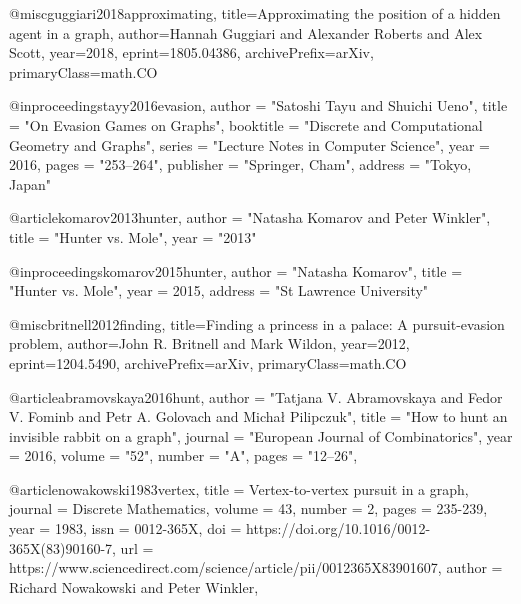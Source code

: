 @misc{guggiari2018approximating,
      title={Approximating the position of a hidden agent in a graph}, 
      author={Hannah Guggiari and Alexander Roberts and Alex Scott},
      year={2018},
      eprint={1805.04386},
      archivePrefix={arXiv},
      primaryClass={math.CO}
    }

@inproceedings{tayy2016evasion,
      author    = "Satoshi Tayu and Shuichi Ueno",
      title     = "On Evasion Games on Graphs",
      booktitle = "Discrete and Computational Geometry and Graphs",
      series    = "Lecture Notes in Computer Science",
      year      = 2016,
      pages     = "253--264",
      publisher = "Springer, Cham",
      address   = "Tokyo, Japan"
    }
    
@article{komarov2013hunter,
      author = "Natasha Komarov and Peter Winkler",
      title  = "Hunter vs. Mole",
      year   = "2013"
    }

@inproceedings{komarov2015hunter,
      author = "Natasha Komarov",
      title = "Hunter vs. Mole",
      year = 2015,
      address = "St Lawrence University"
      }
    
@misc{britnell2012finding,
      title={Finding a princess in a palace: A pursuit-evasion problem}, 
      author={John R. Britnell and Mark Wildon},
      year={2012},
      eprint={1204.5490},
      archivePrefix={arXiv},
      primaryClass={math.CO}
}

@article{abramovskaya2016hunt,
      author   = "Tatjana V. Abramovskaya and Fedor V. Fominb and Petr A. Golovach and Michał Pilipczuk",
      title    = "How to hunt an invisible rabbit on a graph",
      journal  = "European Journal of Combinatorics",
      year     = 2016,
      volume   = "52",
      number   = "A",
      pages    = "12--26",
    }

@article{nowakowski1983vertex,
      title = {Vertex-to-vertex pursuit in a graph},
      journal = {Discrete Mathematics},
      volume = {43},
      number = {2},
      pages = {235-239},
      year = {1983},
      issn = {0012-365X},
      doi = {https://doi.org/10.1016/0012-365X(83)90160-7},
      url = {https://www.sciencedirect.com/science/article/pii/0012365X83901607},
      author = {Richard Nowakowski and Peter Winkler},
    }